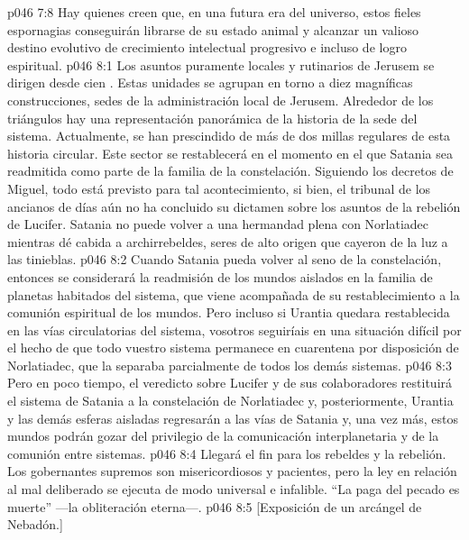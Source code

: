 \vs p046 7:8 \pc Hay quienes creen que, en una futura era del universo, estos fieles espornagias conseguirán librarse de su estado animal y alcanzar un valioso destino evolutivo de crecimiento intelectual progresivo e incluso de logro espiritual.
\vs p046 8:1 Los asuntos puramente locales y rutinarios de Jerusem se dirigen desde cien . Estas unidades se agrupan en torno a diez magníficas construcciones, sedes de la administración local de Jerusem. Alrededor de los triángulos hay una representación panorámica de la historia de la sede del sistema. Actualmente, se han prescindido de más de dos millas regulares de esta historia circular. Este sector se restablecerá en el momento en el que Satania sea readmitida como parte de la familia de la constelación. Siguiendo los decretos de Miguel, todo está previsto para tal acontecimiento, si bien, el tribunal de los ancianos de días aún no ha concluido su dictamen sobre los asuntos de la rebelión de Lucifer. Satania no puede volver a una hermandad plena con Norlatiadec mientras dé cabida a archirrebeldes, seres de alto origen que cayeron de la luz a las tinieblas.
\vs p046 8:2 Cuando Satania pueda volver al seno de la constelación, entonces se considerará la readmisión de los mundos aislados en la familia de planetas habitados del sistema, que viene acompañada de su restablecimiento a la comunión espiritual de los mundos. Pero incluso si Urantia quedara restablecida en las vías circulatorias del sistema, vosotros seguiríais en una situación difícil por el hecho de que todo vuestro sistema permanece en cuarentena por disposición de Norlatiadec, que la separaba parcialmente de todos los demás sistemas.
\vs p046 8:3 \pc Pero en poco tiempo, el veredicto sobre Lucifer y de sus colaboradores restituirá el sistema de Satania a la constelación de Norlatiadec y, posteriormente, Urantia y las demás esferas aisladas regresarán a las vías de Satania y, una vez más, estos mundos podrán gozar del privilegio de la comunicación interplanetaria y de la comunión entre sistemas.
\vs p046 8:4 \pc Llegará el fin para los rebeldes y la rebelión. Los gobernantes supremos son misericordiosos y pacientes, pero la ley en relación al mal deliberado se ejecuta de modo universal e infalible. “La paga del pecado es muerte” ---la obliteración eterna---.
\vsetoff
\vs p046 8:5 [Exposición de un arcángel de Nebadón.]
